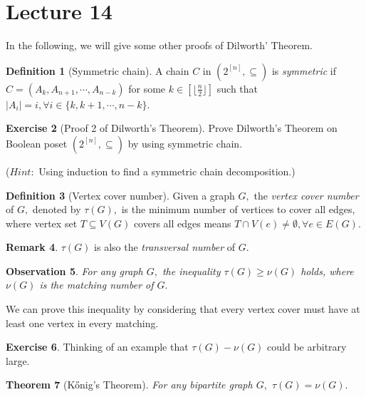 \documentclass{article}
\newtheorem{theorem}{Theorem}[section]
\newtheorem{observation}[theorem]{Observation}
\theoremstyle{definition}
\newtheorem{remark}[theorem]{Remark}
\newtheorem{definition}[theorem]{Definition}
\newtheorem{exercise}[theorem]{Exercise}
\begin{document}
\newpage

\section{Lecture 14}

In the following, we will give some other proofs of Dilworth' Theorem.

\begin{definition}[Symmetric chain]
    A chain $C$ in $(2^{[n]},\subseteq)$ is \emph{symmetric} if $C=(A_{k},A_{n+1},\cdots,A_{n-k})$ for some $k\in [\lfloor \frac{n}{2}\rfloor]$ such that $|A_{i}|=i, \forall i\in\{k,k+1,\cdots,n-k\}.$
\end{definition}

\begin{exercise}[Proof 2 of Dilworth's Theorem]
    Prove Dilworth's Theorem on Boolean poset $(2^{[n]}, \subseteq)$ by using symmetric chain.

    ($Hint:$ Using induction to find a symmetric chain decomposition.)
\end{exercise}

\begin{definition}[Vertex cover number]
    Given a graph $G,$ the \emph{vertex cover number} of $G,$ denoted by $\tau(G),$ is the minimum number of vertices to cover all edges, where vertex set $T\subseteq V(G)$ covers all edges means $T\cap V(e)\neq \emptyset, \forall e\in E(G).$ 
\end{definition}

\begin{remark}
    $\tau(G)$ is also the \emph{transversal number} of $G.$
\end{remark}

\begin{observation}
    For any graph $G,$ the inequality $\tau(G)\geq \nu(G)$ holds, where $\nu(G)$ is the matching number of $G.$
\end{observation}

We can prove this inequality by considering that every vertex cover must have at least one vertex in every matching.

\begin{exercise}
    Thinking of an example that $\tau(G)-\nu(G)$ could be arbitrary large.
\end{exercise}

\begin{theorem}[K\H{o}nig's Theorem\cite{kHonig1931grafok}]
    For any bipartite graph $G,$ $\tau(G)= \nu(G).$
\end{theorem}
\end{document}

